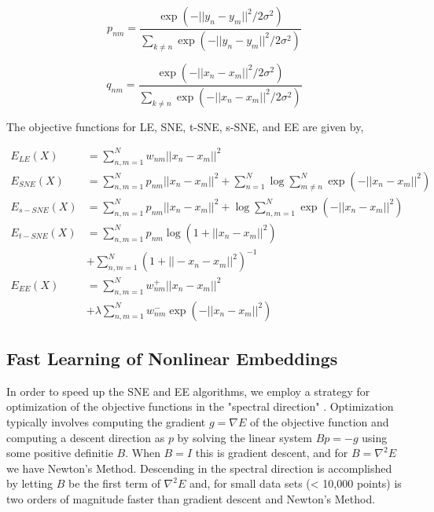 \documentclass{article}
\begin{document}
\begin{equation}
\label{pnm}
p_{nm} = \frac{\exp(-||y_n - y_m||^2/2\sigma^2)}{\sum_{k \neq n} \exp(-||y_n - y_m||^2/2\sigma^2)}
\end{equation}

\begin{equation}
\label{qnm}
q_{nm} = \frac{\exp(-||x_n - x_m||^2/2\sigma^2)}{\sum_{k \neq n} \exp(-||x_n - x_m||^2/2\sigma^2)}
\end{equation}

The objective functions for LE, SNE, t-SNE, s-SNE, and EE are given by, 

\begin{align*}
E_{LE}(X) &= \sum_{n,m=1}^N w_{nm} ||x_n - x_m||^2 \\
E_{SNE}(X) &= \sum_{n,m=1}^N p_{nm} ||x_n - x_m||^2 + \sum_{n=1}^N \log \sum_{m \neq n}^N \exp(-||x_n - x_m||^2) \\
E_{s-SNE}(X) &= \sum_{n,m=1}^N p_{nm} ||x_n - x_m||^2 + \log \sum_{n,m =1}^N \exp(-||x_n - x_m||^2) \\
E_{t-SNE}(X) &= \sum_{n,m=1}^N p_{nm} \log(1+||x_n - x_m||^2) \\ 
	&+ \sum_{n,m =1}^N (1 + ||-x_n - x_m||^2)^{-1} \\
E_{EE}(X) &= \sum_{n,m=1}^N w^+_{nm} ||x_n - x_m||^2 \\
	&+ \lambda \sum_{n,m =1}^N w^-_{nm} \exp (-||x_n - x_m||^2)
\end{align*}


\subsection{Fast Learning of Nonlinear Embeddings}
In order to speed up the SNE and EE algorithms, we employ a strategy for optimization of the objective functions in the "spectral direction" \cite{Vladymyrov:2012ws}. Optimization typically involves computing the gradient $g = \nabla E$ of the objective function and computing a descent direction as $p$ by solving the linear system $Bp = -g$ using some positive definitie $B$. When $B=I$ this is gradient descent, and for $B=\nabla^2 E$ we have Newton's Method. Descending in the spectral direction is accomplished by letting $B$ be the first term of $\nabla^2 E$ and, for small data sets (< 10,000 points) is two orders of magnitude faster than gradient descent and Newton's Method.
\end{document}
